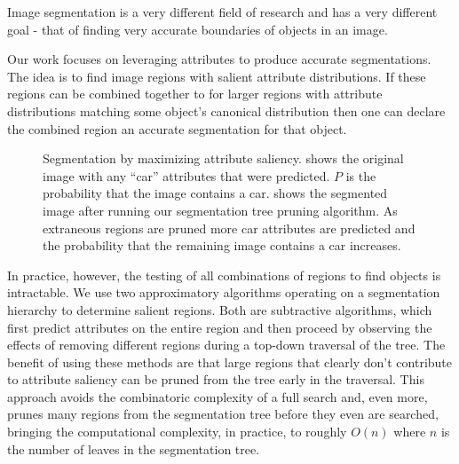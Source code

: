 \documentclass[10pt,twocolumn,letterpaper]{article}
\begin{document}
Image segmentation is a very different field of research and has a very different
goal - that of finding very accurate boundaries of objects in an image.

Our work focuses on leveraging attributes to produce accurate segmentations.
The idea is to find image regions with salient attribute distributions.  If
these regions can be combined together to for larger regions with attribute 
distributions matching some object's canonical distribution then one can
declare the combined region an accurate segmentation for that object.

\begin{figure}
\centering
{}
\caption{Segmentation by maximizing attribute saliency.   shows
the original image with any ``car'' attributes that were predicted.  $P$ is the probability
that the image contains a car.   shows the segmented image after
running our segmentation tree pruning algorithm.  As extraneous regions are pruned
more car attributes are predicted and the probability that the remaining image 
contains a car increases.}
\label{fig:truck}
\end{figure}

In practice, however, the testing of all combinations of regions to find 
objects is intractable.  We use two approximatory algorithms operating on
a segmentation hierarchy to determine salient regions.  Both are subtractive
algorithms, which first predict attributes on the entire region and then
proceed by observing the effects of removing different regions during
a top-down traversal of the tree.  The benefit of using these methods are
that large regions that clearly don't contribute to attribute saliency
can be pruned from the tree early in the traversal.  This approach avoids
the combinatoric complexity of a full search and, even more, prunes many
regions from the segmentation tree before they even are searched, bringing
the computational complexity, in practice, to roughly $O(n)$ where $n$ is
the number of leaves in the segmentation tree.
\end{document}
